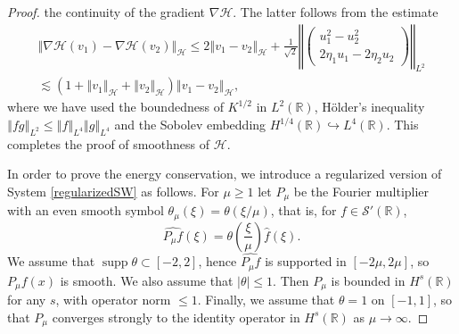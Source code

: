 \documentclass[10pt,a4paper]{amsart}
\DeclareMathOperator{\supp}{supp}
\newcommand{\R}{\mathbb{R}}
\newcommand{\abs}[1]{\vert #1 \vert}
\newcommand{\norm}[1]{\left\Vert #1 \right\Vert}
\begin{document}
\begin{proof}
the continuity of the  gradient $\nabla \mathcal H$.
The latter follows from the estimate
\begin{multline*}
    \norm{ \nabla \mathcal H(v_1) - \nabla \mathcal H(v_2) }_{\mathcal H}
    \leqslant
    2
    \norm{ v_1 - v_2 }_{\mathcal H}
    +
    \frac 1{\sqrt 2}
    \norm{
        \begin{pmatrix}
            u_1^2 - u_2^2
            \\
            2 \eta_1 u_1 - 2 \eta_2 u_2
        \end{pmatrix}
    }_{L^2}
    \\
    \lesssim
    \left(
        1
        +
        \norm{ v_1 }_{\mathcal H}
        +
        \norm{ v_2 }_{\mathcal H}
    \right)
    \norm{ v_1 - v_2 }_{\mathcal H}
    ,
\end{multline*}
where we have used the boundedness of $K^{1/2}$ in $L^2(\R)$,
H\"older's inequality
\(
    \norm{fg}_{L^2}
    \leqslant
    \norm{f}_{L^4}
    \norm{g}_{L^4}
\)
and the Sobolev embedding $H^{1/4}(\R) \hookrightarrow L^4(\R)$.
This completes the proof of smoothness of $\mathcal H$.


In order to prove the energy conservation,
we introduce a regularized version  of System \eqref{regularizedSW} as follows.
%
%
For $\mu \geqslant 1$ let $P_\mu$
be the Fourier multiplier with an even smooth symbol $\theta_\mu(\xi) = \theta(\xi/\mu)$,
that is, for $f \in \mathcal S'(\R)$,
\[
    \widehat{P_\mu f}(\xi) = \theta\left( \frac{\xi}{\mu} \right) \widehat f(\xi)
    .
\]
We assume that $\supp\theta \subset [-2,2]$,
hence $\widehat{P_\mu f}$ is supported in $[-2\mu,2\mu]$, so $P_\mu f(x)$ is smooth.
We also assume that $\abs{\theta} \leqslant 1$.
Then $P_\mu$ is bounded in $H^s(\R)$ for any $s$, with operator norm $\leqslant 1$. 
Finally, we assume that $\theta = 1$ on $[-1, 1]$,
so that $P_\mu$ converges strongly to the identity operator
in $H^s(\R)$ as $\mu \to \infty$.



\end{proof}
\end{document}
